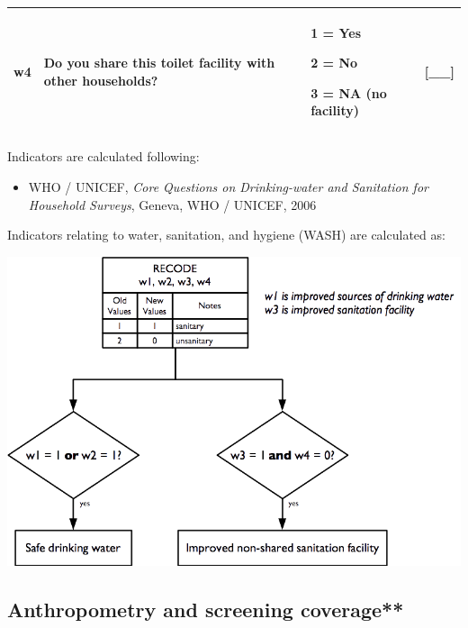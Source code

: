 \documentclass[12pt,a4paper]{book}
\providecommand{\tightlist}{%
  \setlength{\itemsep}{0pt}\setlength{\parskip}{0pt}}
\theoremstyle{definition}
\theoremstyle{definition}
\theoremstyle{definition}
\theoremstyle{remark}
\begin{document}
\begin{longtable}[]{@{}llll@{}}
\toprule
\begin{minipage}[t]{0.24\columnwidth}\raggedright
w4\strut
\end{minipage} & \begin{minipage}[t]{0.24\columnwidth}\raggedright
Do you share this toilet facility with other households?\strut
\end{minipage} & \begin{minipage}[t]{0.24\columnwidth}\raggedright
1 = Yes

2 = No

3 = NA (no facility)\strut
\end{minipage} & \begin{minipage}[t]{0.24\columnwidth}\raggedright
{[}\_\_{]}\strut
\end{minipage}\tabularnewline
\bottomrule
\end{longtable}

Indicators are calculated following:

\begin{itemize}
\tightlist
\item
  WHO / UNICEF, \emph{Core Questions on Drinking-water and Sanitation
  for Household Surveys}, Geneva, WHO / UNICEF, 2006
\end{itemize}

Indicators relating to water, sanitation, and hygiene (WASH) are
calculated as:

\begin{center}\includegraphics{figures/indicators24} \end{center}

\hypertarget{anthropometry-and-screening-coverage}{%
\subsection{Anthropometry and screening
coverage**}\label{anthropometry-and-screening-coverage}}
\end{document}
